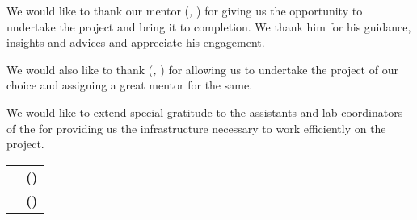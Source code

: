 
We would like to thank our mentor \textbf{\mentorName{}}
(\textit{\mentorJobTitle{}, \departmentName{}}) for giving us the opportunity
to undertake the project and bring it to completion. We thank him for his
guidance, insights and advices and appreciate his engagement.

We would also like to thank \textbf{\headOfDeptName{}}
(\textit{\headOfDeptJobTitle{}, \departmentName{}}) for allowing us to
undertake the project of our choice and assigning a great mentor for the same.

We would like to extend special gratitude to the assistants and lab
coordinators of the \departmentName{} for providing us the infrastructure
necessary to work efficiently on the project.

\vfill

\begin{center}
    \begin{tabularx}{\textwidth}{L R}
        & \textbf{\authorAshhar{} (\authorAshharRoll{})}\\
        & \textbf{\authorAdeela{} (\authorAdeelaRoll{})}\\
    \end{tabularx}
\end{center}


